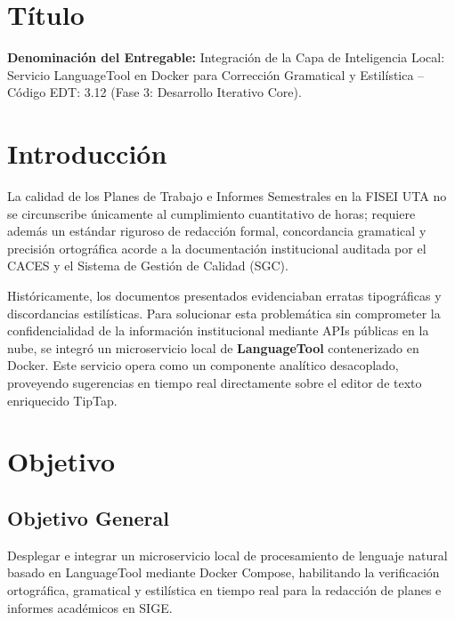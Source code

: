 \documentclass[12pt,a4paper]{article}
\begin{document}

\vspace{0.25cm}

\section{Título}
\textbf{Denominación del Entregable:} Integración de la Capa de Inteligencia Local: Servicio LanguageTool en Docker para Corrección Gramatical y Estilística -- Código EDT: 3.12 (Fase 3: Desarrollo Iterativo Core).

\section{Introducción}
La calidad de los Planes de Trabajo e Informes Semestrales en la FISEI UTA no se circunscribe únicamente al cumplimiento cuantitativo de horas; requiere además un estándar riguroso de redacción formal, concordancia gramatical y precisión ortográfica acorde a la documentación institucional auditada por el CACES y el Sistema de Gestión de Calidad (SGC).

Históricamente, los documentos presentados evidenciaban erratas tipográficas y discordancias estilísticas. Para solucionar esta problemática sin comprometer la confidencialidad de la información institucional mediante APIs públicas en la nube, se integró un microservicio local de \textbf{LanguageTool} contenerizado en Docker. Este servicio opera como un componente analítico desacoplado, proveyendo sugerencias en tiempo real directamente sobre el editor de texto enriquecido TipTap.

\section{Objetivo}

\subsection{Objetivo General}
Desplegar e integrar un microservicio local de procesamiento de lenguaje natural basado en LanguageTool mediante Docker Compose, habilitando la verificación ortográfica, gramatical y estilística en tiempo real para la redacción de planes e informes académicos en SIGE.
\end{document}
